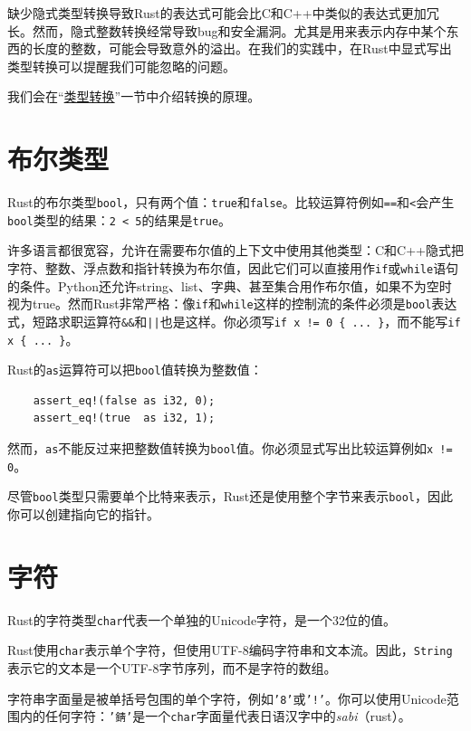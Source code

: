 缺少隐式类型转换导致Rust的表达式可能会比C和C++中类似的表达式更加冗长。然而，隐式整数转换经常导致bug和安全漏洞。尤其是用来表示内存中某个东西的长度的整数，可能会导致意外的溢出。在我们的实践中，在Rust中显式写出类型转换可以提醒我们可能忽略的问题。

我们会在“\hyperref[cast]{类型转换}”一节中介绍转换的原理。

\section{布尔类型}

Rust的布尔类型\texttt{bool}，只有两个值：\texttt{true}和\texttt{false}。比较运算符例如\texttt{==}和\texttt{<}会产生\texttt{bool}类型的结果：\texttt{2 < 5}的结果是\texttt{true}。

许多语言都很宽容，允许在需要布尔值的上下文中使用其他类型：C和C++隐式把字符、整数、浮点数和指针转换为布尔值，因此它们可以直接用作\texttt{if}或\texttt{while}语句的条件。Python还允许string、list、字典、甚至集合用作布尔值，如果不为空时视为true。然而Rust非常严格：像\texttt{if}和\texttt{while}这样的控制流的条件必须是\texttt{bool}表达式，短路求职运算符\texttt{\&\&}和\texttt{||}也是这样。你必须写\texttt{if x != 0 \{ ... \}}，而不能写\texttt{if x \{ ... \}}。

Rust的\texttt{as}运算符可以把\texttt{bool}值转换为整数值：
\begin{verbatim}
    assert_eq!(false as i32, 0);
    assert_eq!(true  as i32, 1);
\end{verbatim}

然而，\texttt{as}不能反过来把整数值转换为\texttt{bool}值。你必须显式写出比较运算例如\texttt{x != 0}。

尽管\texttt{bool}类型只需要单个比特来表示，Rust还是使用整个字节来表示\texttt{bool}，因此你可以创建指向它的指针。

\section{字符}\label{char}
Rust的字符类型\texttt{char}代表一个单独的Unicode字符，是一个32位的值。

Rust使用\texttt{char}表示单个字符，但使用UTF-8编码字符串和文本流。因此，\texttt{String}表示它的文本是一个UTF-8字节序列，而不是字符的数组。

字符串字面量是被单括号包围的单个字符，例如\texttt{'8'}或\texttt{'!'}。你可以使用Unicode范围内的任何字符：\texttt{'錆'}是一个\texttt{char}字面量代表日语汉字中的\emph{sabi}（rust）。

